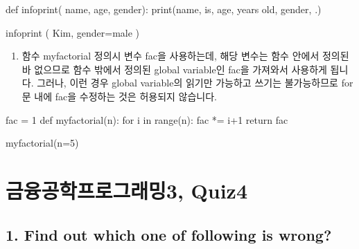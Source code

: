 \documentclass[
  letterpaper,
  DIV=11,
  numbers=noendperiod]{scrreprt}
\newenvironment{Shaded}{\begin{snugshade}}{\end{snugshade}}
\newcommand{\BuiltInTok}[1]{\textcolor[rgb]{0.00,0.23,0.31}{#1}}
\newcommand{\ControlFlowTok}[1]{\textcolor[rgb]{0.00,0.23,0.31}{#1}}
\newcommand{\DecValTok}[1]{\textcolor[rgb]{0.68,0.00,0.00}{#1}}
\newcommand{\KeywordTok}[1]{\textcolor[rgb]{0.00,0.23,0.31}{#1}}
\newcommand{\NormalTok}[1]{\textcolor[rgb]{0.00,0.23,0.31}{#1}}
\newcommand{\OperatorTok}[1]{\textcolor[rgb]{0.37,0.37,0.37}{#1}}
\newcommand{\StringTok}[1]{\textcolor[rgb]{0.13,0.47,0.30}{#1}}
\providecommand{\tightlist}{%
  \setlength{\itemsep}{0pt}\setlength{\parskip}{0pt}}\usepackage{longtable,booktabs,array}
\begin{document}
\begin{Shaded}
\begin{Highlighting}[]
\KeywordTok{def}\NormalTok{ infoprint( name, age, gender):}
    \BuiltInTok{print}\NormalTok{(name, }\StringTok{\textquotesingle{}is\textquotesingle{}}\NormalTok{, age, }\StringTok{\textquotesingle{}years old\textquotesingle{}}\NormalTok{, gender, }\StringTok{\textquotesingle{}.\textquotesingle{}}\NormalTok{)}

\NormalTok{infoprint ( }\StringTok{\textquotesingle{}Kim\textquotesingle{}}\NormalTok{, gender}\OperatorTok{=}\StringTok{\textquotesingle{}male\textquotesingle{}}\NormalTok{ )}
\end{Highlighting}
\end{Shaded}

\begin{enumerate}
\def\labelenumi{(\arabic{enumi})}
\setcounter{enumi}{2}
\tightlist
\item
  함수 myfactorial 정의시 변수 fac을 사용하는데, 해당 변수는 함수 안에서
  정의된바 없으므로 함수 밖에서 정의된 global variable인 fac을 가져와서
  사용하게 됩니다. 그러나, 이런 경우 global variable의 읽기만 가능하고
  쓰기는 불가능하므로 for문 내에 fac을 수정하는 것은 허용되지 않습니다.
\end{enumerate}

\begin{Shaded}
\begin{Highlighting}[]
\NormalTok{fac }\OperatorTok{=} \DecValTok{1}
\KeywordTok{def}\NormalTok{ myfactorial(n):}
    \ControlFlowTok{for}\NormalTok{ i }\KeywordTok{in} \BuiltInTok{range}\NormalTok{(n):}
\NormalTok{         fac }\OperatorTok{*=}\NormalTok{ i}\OperatorTok{+}\DecValTok{1}
    \ControlFlowTok{return}\NormalTok{ fac}

\NormalTok{myfactorial(n}\OperatorTok{=}\DecValTok{5}\NormalTok{)}
\end{Highlighting}
\end{Shaded}

\chapter*{금융공학프로그래밍3,
Quiz4}\label{uxae08uxc735uxacf5uxd559uxd504uxb85cuxadf8uxb798uxbc0d3-quiz4}


\section*{1. Find out which one of following is
wrong?}\label{find-out-which-one-of-following-is-wrong}
\end{document}
